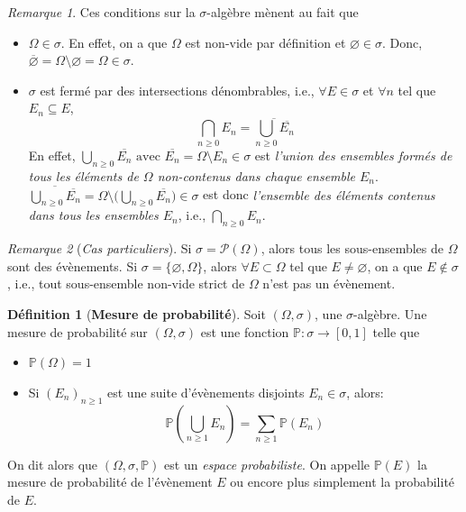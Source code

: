 \documentclass[12pt,a4paper]{report}
\theoremstyle{definition}%
\newtheorem{definition}{Définition}[chapter]
\theoremstyle{remark}
\newtheorem{remark}{Remarque}[chapter]
\newcommand{\ie}{i.e., }
\let\labelitemi\labelitemii
\begin{document}
\begin{remark} \label{probaremark}
	Ces conditions sur la $\sigma$-algèbre mènent au fait que
	\begin{itemize}
		\renewcommand{\labelitemi}{\tiny$\bullet$}
		\item
	$\Omega \in \sigma$. En effet, on a que $\Omega$ est non-vide par définition et $\varnothing \in \sigma$. Donc, $\overline{\varnothing} = \Omega \setminus \varnothing = \Omega \in \sigma$.
		\item 	$\sigma$ est fermé par des intersections dénombrables, \ie $\forall E \in \sigma$ et $\forall n$ tel que $E_n \subseteq E$,
		\[ \bigcap_{n \geq 0} E_n = \overline{\bigcup_{n \geq 0} \overline{E_n}}\]
		En effet, $\bigcup_{n \geq 0} \overline{E_n} \text{ avec } \overline{E_n}  = \Omega \setminus E_n \in \sigma$ est \textit{l'union des ensembles formés de tous les éléments de $\Omega$ non-contenus dans chaque ensemble $E_n$}. \\
		$\overline{\bigcup_{n \geq 0} \overline{E_n}} = \Omega \setminus \big(\bigcup_{n \geq 0} \overline{E_n} \big) \in \sigma$ est donc \textit{l'ensemble des éléments contenus dans tous les ensembles $E_n$}, \ie $\bigcap_{n \geq 0} E_n$.
	\end{itemize}
\end{remark}
\begin{remark}[\textit{Cas particuliers}]
		Si $\sigma = \mathcal{P}(\Omega)$, alors tous les sous-ensembles de $\Omega$ sont des évènements. Si
		$\sigma = \{\varnothing, \Omega\}$, alors $\forall E \subset \Omega$ tel que $E \neq \varnothing$, on a que $E \notin \sigma$, \ie tout sous-ensemble non-vide strict de $\Omega$ n'est pas un évènement.
\end{remark}

\begin{definition}[\textbf{Mesure de probabilité}]\label{proba_measure} Soit $(\Omega, \sigma)$, une $\sigma$-algèbre.
	Une mesure de probabilité sur $(\Omega, \sigma)$ est une fonction $\mathbb{P} : \sigma \rightarrow [0, 1]$ telle que
	\begin{itemize}
		\renewcommand{\labelitemi}{\tiny$\bullet$}
		\item $\mathbb{P}(\Omega) = 1$
		\item Si $(E_n)_{n \geq 1}$ est une suite d'évènements disjoints $E_n \in \sigma$, alors:
		\[\mathbb{P}(\bigcup_{n \geq 1} E_n) = \sum_{n \geq 1} \mathbb{P}(E_n)\]
	\end{itemize}
	On dit alors que $(\Omega, \sigma, \mathbb{P})$ est un \textit{espace probabiliste}.
	On appelle $\mathbb{P}(E)$ la mesure de probabilité de l'évènement $E$ ou encore plus simplement la probabilité de $E$.
\end{definition}
\end{document}
